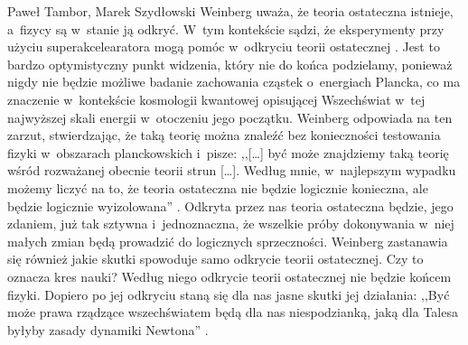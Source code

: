 \begin{artplenv2auth}{Paweł Tambor, Marek Szydłowski}
Weinberg uważa, że teoria ostateczna istnieje, a~fizycy są w~stanie ją odkryć. W~tym kontekście sądzi, że eksperymenty przy użyciu superakcelearatora mogą pomóc w~odkryciu teorii ostatecznej
\parencite[][s.~186]{weinberg_sen_1992}. %
 Jest to bardzo optymistyczny punkt widzenia, który nie do końca podzielamy, ponieważ nigdy nie będzie możliwe badanie zachowania cząstek o~energiach Plancka, co ma znaczenie w~kontekście kosmologii kwantowej opisującej Wszechświat w~tej najwyższej skali energii w~otoczeniu jego początku. Weinberg odpowiada na ten zarzut, stwierdzając, że taką teorię można znaleźć bez konieczności testowania fizyki w~obszarach planckowskich i~pisze: ,,[\ldots] być może znajdziemy taką teorię wśród rozważanej obecnie teorii strun [\ldots]. Według mnie, w~najlepszym wypadku możemy liczyć na to, że teoria ostateczna nie będzie logicznie konieczna, ale będzie logicznie wyizolowana'' 
\parencite[][s.~187]{weinberg_sen_1992}. %
 Odkryta przez nas teoria ostateczna będzie, jego zdaniem, już tak sztywna i~jednoznaczna, że wszelkie próby dokonywania w~niej małych zmian będą prowadzić do logicznych sprzeczności. Weinberg zastanawia się również jakie skutki spowoduje samo odkrycie teorii ostatecznej. Czy to oznacza kres nauki? Według niego odkrycie teorii ostatecznej nie będzie końcem fizyki. Dopiero po jej odkryciu staną się dla nas jasne skutki jej działania: ,,Być może prawa rządzące wszechświatem będą dla nas niespodzianką, jaką dla Talesa byłyby zasady dynamiki Newtona'' 
\parencite[][s.~190]{weinberg_sen_1992}.%



\end{artplenv2auth}
